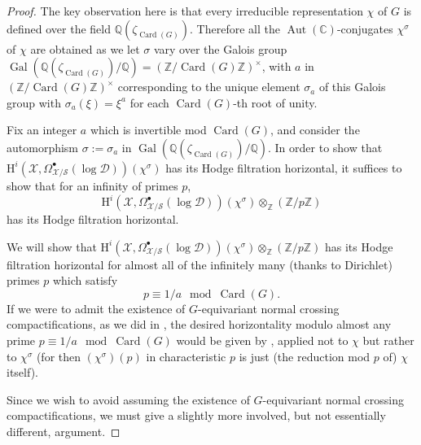 \begin{proof}
The key observation here is that every irreducible representation \(\chi\) of \(G\) is defined over the field \(\mathbb{Q}(\zeta_{\operatorname{Card}(G)})\). Therefore all the \(\operatorname{Aut}(\mathbb{C})\)-conjugates \(\chi^\sigma\) of \(\chi\) are obtained as we let \(\sigma\) vary over the Galois group \(\operatorname{Gal}(\mathbb{Q}(\zeta_{\operatorname{Card}(G)})/\mathbb{Q})=(\mathbb{Z}/\operatorname{Card}(G)\mathbb{Z})^\times\), with \(a\) in \((\mathbb{Z}/\operatorname{Card}(G)\mathbb{Z})^\times\) corresponding to the unique element \(\sigma_a\) of this Galois group with \(\sigma_a(\xi)=\xi^a\) for each \(\operatorname{Card}(G)\)-th root of unity.

Fix an integer \(a\) which is invertible mod \(\operatorname{Card}(G)\), and consider the automorphism \(\sigma:=\sigma_a\) in \(\operatorname{Gal}(\mathbb{Q}(\zeta_{\operatorname{Card}(G)})/\mathbb{Q})\). In order to show that \(\mathrm{H}^i(\mathcal{X},\Omega^\bullet_{\mathcal{X}/\mathcal{S}}(\log\mathcal{D}))(\chi^\sigma)\) has its Hodge filtration horizontal, it suffices to show that for an infinity of primes \(p\),
\[
\mathrm{H}^i(\mathcal{X},\Omega^\bullet_{\mathcal{X}/\mathcal{S}}(\log\mathcal{D}))(\chi^\sigma)\otimes_{\mathbb{Z}}(\mathbb{Z}/p\mathbb{Z})
\]
has its Hodge filtration horizontal.

We will show that \(\mathrm{H}^i(\mathcal{X},\Omega^\bullet_{\mathcal{X}/\mathcal{S}}(\log\mathcal{D}))(\chi^\sigma)\otimes_{\mathbb{Z}}(\mathbb{Z}/p\mathbb{Z})\) has its Hodge filtration horizontal for almost all of the infinitely many (thanks to Dirichlet) primes \(p\) which satisfy
\[
p\equiv 1/a\mod \operatorname{Card}(G).
\]
If we were to admit the existence of \(G\)-equivariant normal crossing compactifications, as we did in \cite{Ka-ASDE}, the desired horizontality modulo almost any prime \(p\equiv 1/a\mod \operatorname{Card}(G)\) would be given by \cite[3.3.2]{Ka-ASDE}, applied not to \(\chi\) but rather to \(\chi^\sigma\) (for then \((\chi^\sigma)(p)\) in characteristic \(p\) is just (the reduction mod \(p\) of) \(\chi\) itself).

Since we wish to avoid assuming the existence of \(G\)-equivariant normal crossing compactifications, we must give a slightly more involved, but not essentially different, argument.


\end{proof}
